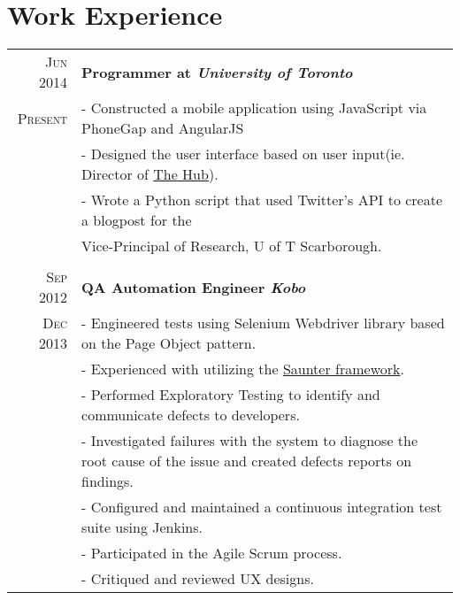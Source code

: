 \documentclass[a4paper, 10pt]{article}
\newcommand{\uhref}[2]{\href{#1}{\color{gray}#2}}
\begin{document}
\section{Work Experience}
\begin{tabular}{r|p{16cm}}
	\textsc{Jun 2014}
	&	\bf{Programmer at \emph{University of Toronto}}\\
	\textsc{Present}
	& - Constructed a mobile application using JavaScript via PhoneGap and AngularJS\\
	& - Designed the user interface based on user input(ie. Director of \uhref{http://blog.utsc.ut    oronto.ca/thehub/}{The Hub}).\\
	& - Wrote a Python script that used Twitter's API to create a blogpost for
	the\\&	Vice-Principal of Research, U of T Scarborough.\\
	\\
	\textsc{Sep 2012}
	&	\bf{QA Automation Engineer \emph{Kobo}}\\
	\textsc{Dec 2013}
	& - Engineered tests using Selenium Webdriver library based on the Page Object pattern.\\
	& - Experienced with utilizing the \uhref{https://github.com/Element-34/py.saunter}{Saunter framework}.\\
	& - Performed Exploratory Testing to identify and communicate defects to developers.\\
	& - Investigated failures with the system to diagnose the root cause of the issue and created defects reports on findings.\\
	& - Configured and maintained a continuous integration test suite using	Jenkins.\\
	& - Participated in the Agile Scrum process.\\
	& - Critiqued and reviewed UX designs.\\
\end{tabular}\\\\
\end{document}
